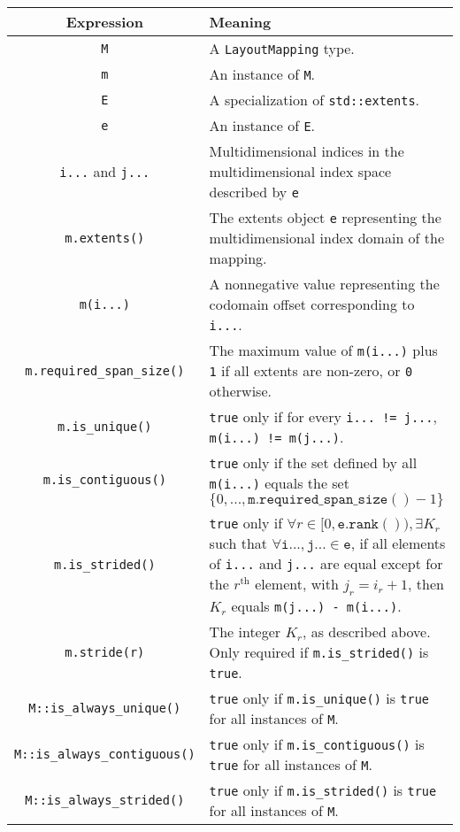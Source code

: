\begin{tabular}{|c|p{15em}|}
\hline
Expression & Meaning \\
\hline
    \texttt{M} & A \texttt{LayoutMapping} type. \\
    \texttt{m} & An instance of \texttt{M}. \\
    \texttt{E} & A specialization of \texttt{std::extents}. \\
    \texttt{e} & An instance of \texttt{E}. \\
    \texttt{i...} and \texttt{j...} & Multidimensional indices in the multidimensional index space described by \texttt{e} \\
    \texttt{m.extents()} & The extents object \texttt{e} representing the multidimensional index domain of the mapping.  \\
    \texttt{m(i...)} & A nonnegative value representing the codomain offset corresponding to \texttt{i...}. \\
    \texttt{m.required\_span\_size()} & The maximum value of \texttt{m(i...)} plus \texttt{1} if all extents are non-zero, or \texttt{0} otherwise. \\
    \texttt{m.is\_unique()} & \texttt{true} only if for every \texttt{i... != j...}, \texttt{m(i...) != m(j...)}. \\
    \texttt{m.is\_contiguous()} & \texttt{true} only if the set defined by all \texttt{m(i...)} equals the set $\{0, ..., \mathtt{m.required\_span\_size()} - 1\}$ \\
    \texttt{m.is\_strided()} & \texttt{true} only if $\forall r \in [0, \mathtt{e.rank()}), \exists K_r$ such that $\forall \mathtt{i...}, \mathtt{j...} \in \mathtt{e}$, if all elements of \texttt{i...} and \texttt{j...} are equal except for the $r^{\mathrm{th}}$ element, with $j_r = i_r + 1$, then $K_r$ equals \texttt{m(j...) - m(i...)}. \\
    \texttt{m.stride(r)} & The integer $K_r$, as described above.  Only required if \texttt{m.is\_strided()} is \texttt{true}. \\
    \texttt{M::is\_always\_unique()} & \texttt{true} only if \texttt{m.is\_unique()} is \texttt{true} for all instances of \texttt{M}. \\
    \texttt{M::is\_always\_contiguous()} & \texttt{true} only if \texttt{m.is\_contiguous()} is \texttt{true} for all instances of \texttt{M}. \\
    \texttt{M::is\_always\_strided()} & \texttt{true} only if \texttt{m.is\_strided()} is \texttt{true} for all instances of \texttt{M}. \\
\hline
\end{tabular}
